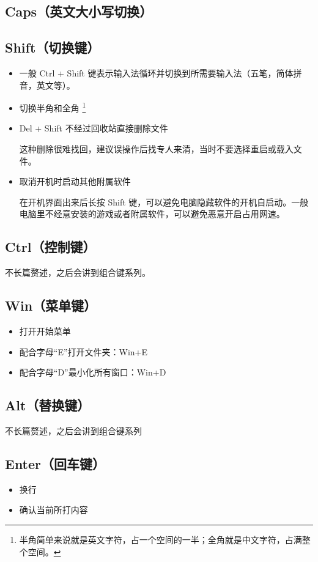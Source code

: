 \documentclass[12pt]{article}
\begin{document}
\subsection{Caps（英文大小写切换）}
\subsection{Shift（切换键）}
\begin{itemize}
	\item 一般 Ctrl + Shift 键表示输入法循环并切换到所需要输入法（五笔，简体拼音，英文等）。
	\item 切换半角和全角
	\footnote{半角简单来说就是英文字符，占一个空间的一半；全角就是中文字符，占满整个空间。}
	\item Del + Shift 不经过回收站直接删除文件
	
这种删除很难找回，建议误操作后找专人来清，当时不要选择重启或载入文件。
	\item {取消开机时启动其他附属软件}

在开机界面出来后长按 Shift 键，可以避免电脑隐藏软件的开机自启动。一般电脑里不经意安装的游戏或者附属软件，可以避免恶意开启占用网速。
\end{itemize}
\subsection{Ctrl（控制键）}
	不长篇赘述，之后会讲到组合键系列。
\subsection{Win（菜单键）}
\begin{itemize}
	\item 打开开始菜单
	\item 配合字母“E”打开文件夹：Win+E
	\item 配合字母“D”最小化所有窗口：Win+D
\end{itemize}
\subsection{Alt（替换键）}
	不长篇赘述，之后会讲到组合键系列
\subsection{Enter（回车键）}
\begin{itemize}
	\item 换行
	\item 确认当前所打内容
\end{itemize}
\end{document}
